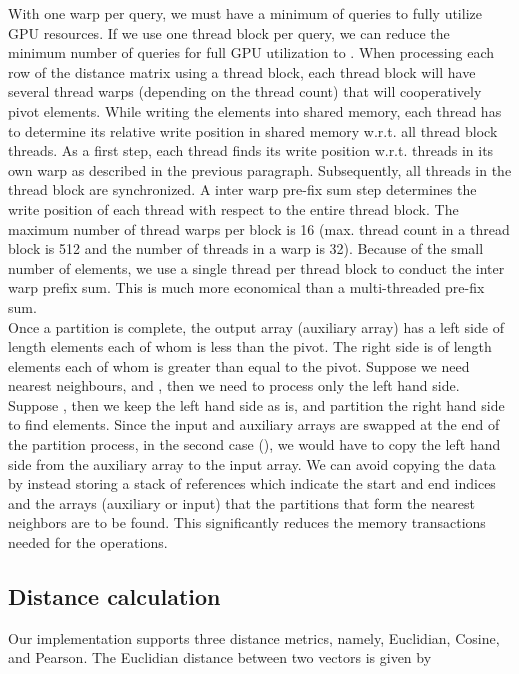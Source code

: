 \documentclass[10pt]{article}
\begin{document}
With one warp per query, we must have a minimum of  queries to fully utilize GPU resources. If we use one thread block per query, we can reduce the minimum number of queries for full GPU utilization to . When processing each row of the distance matrix using a thread block, each thread block will have several thread warps (depending on the thread count) that will cooperatively pivot elements. While writing the elements into shared memory, each thread has to determine its relative write position in shared memory w.r.t. all thread block threads. As a first step, each thread finds its write position w.r.t. threads in its own warp as described in the previous paragraph. Subsequently,  all threads in the thread block are synchronized. A inter warp pre-fix sum step determines the write position of each thread with respect to the entire thread block. The maximum number of thread warps per block is 16 (max. thread count in a thread block is 512 and the number of threads in a warp is 32). Because of the small number of elements, we use a single thread per thread block to conduct the inter warp prefix sum. This is much more economical than a multi-threaded pre-fix sum. \\

Once a partition is complete, the output array (auxiliary array) has a left side of length  elements each of whom is less than the pivot. The right side is of length  elements each of whom is greater than equal to the pivot. Suppose we need  nearest neighbours, and , then we need to process only the left hand side. Suppose , then we keep the left hand side as is, and partition the right hand side to find  elements. Since the input and auxiliary arrays are swapped at the end of the partition process, in the second case (), we would have to copy the left hand side from the auxiliary array to the input array. We can avoid copying the data by instead storing a stack of references which indicate the start and end indices and the arrays (auxiliary or input) that the partitions that form the  nearest neighbors are to be found. This significantly reduces the memory transactions needed for the operations.\\

\subsection*{Distance calculation}
Our implementation supports three distance metrics, namely, Euclidian, Cosine, and Pearson. The Euclidian distance between two vectors  is given by
\end{document}
